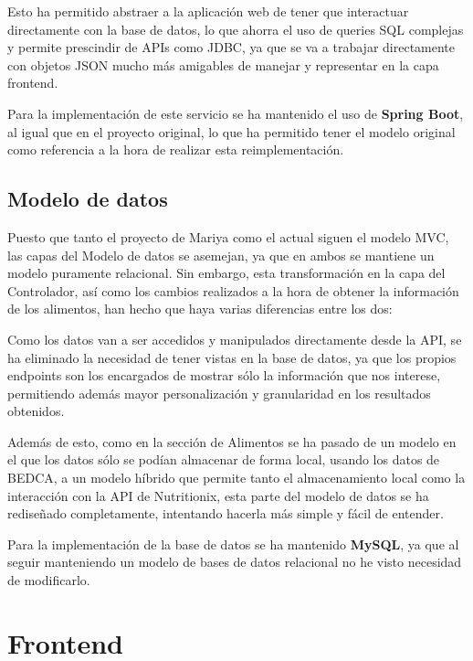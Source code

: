 Esto ha permitido abstraer a la aplicación web de tener que interactuar directamente con la base de datos, lo que ahorra el uso de queries SQL complejas y permite prescindir de APIs como JDBC, ya que se va a trabajar directamente con objetos JSON mucho más amigables de manejar y representar en la capa frontend.

Para la implementación de este servicio se ha mantenido el uso de \textbf{Spring Boot}, al igual que en el proyecto original, lo que ha permitido tener el modelo original como referencia a la hora de realizar esta reimplementación.

\subsection{Modelo de datos}

Puesto que tanto el proyecto de Mariya como el actual siguen el modelo MVC, las capas del Modelo de datos se asemejan, ya que en ambos se mantiene un modelo puramente relacional. Sin embargo, esta transformación en la capa del Controlador, así como los cambios realizados a la hora de obtener la información de los alimentos, han hecho que haya varias diferencias entre los dos:


Como los datos van a ser accedidos y manipulados directamente desde la API, se ha eliminado la necesidad de tener vistas en la base de datos, ya que los propios endpoints son los encargados de mostrar sólo la información que nos interese, permitiendo además mayor personalización y granularidad en los resultados obtenidos.

Además de esto, como en la sección de Alimentos se ha pasado de un modelo en el que los datos sólo se podían almacenar de forma local, usando los datos de BEDCA, a un modelo híbrido que permite tanto el almacenamiento local como la interacción con la API de Nutritionix, esta parte del modelo de datos se ha rediseñado completamente, intentando hacerla más simple y fácil de entender.


Para la implementación de la base de datos se ha mantenido \textbf{MySQL}, ya que al seguir manteniendo un modelo de bases de datos relacional no he visto necesidad de modificarlo.

\section{Frontend}


